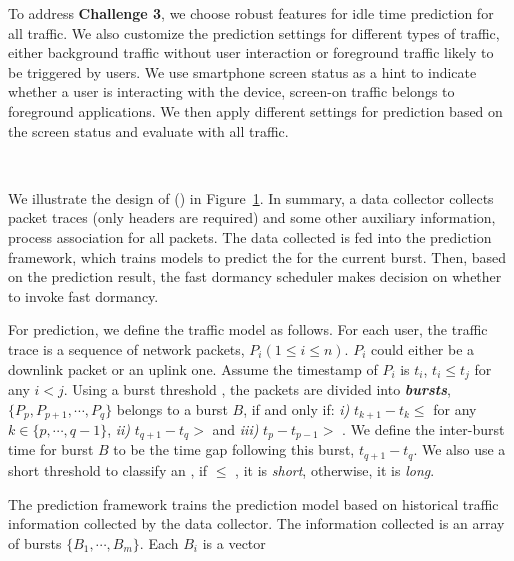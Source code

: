 To address {\bf Challenge 3}, we choose robust features for idle time prediction for all traffic. We also customize the prediction settings for different types of traffic, either background traffic without user interaction or foreground traffic likely to be triggered by users. We use smartphone screen status as a hint to indicate whether a user is interacting with the device, \ie screen-on traffic belongs to foreground applications. We then apply different settings for prediction based on the screen status and evaluate \NAME with all traffic.

\begin{figure}[t]
\centering
{} \\
\label{fig:flow}
\end{figure}

We illustrate the design of  \NAMEFULL (\NAME) in Figure~\ref{fig:flow}. In summary, a data collector collects packet traces (only headers are required) and some other auxiliary information, \eg process association for all packets. The data collected is fed into the \IBT prediction framework, which trains models to predict the \IBT for the current burst. Then, based on the prediction result, the fast dormancy scheduler makes decision on whether to invoke fast dormancy.

For \IBT prediction, we define the traffic model as follows. For each user, the traffic trace is a sequence of network packets, $P_{i} (1 \leq i \leq n)$. $P_{i}$ could either be a downlink packet or an uplink one. Assume the timestamp of $P_{i}$ is $t_{i}$, $t_{i} \leq t_{j}$ for any $i < j$. Using a burst threshold \BT, the packets are divided into \textbf{\em bursts}, \ie $\{P_{p}, P_{p+1}, \cdots, P_{q}\}$ belongs to a burst $B$, if and only if: {\em i)} $t_{k + 1} - t_{k} \leq$ \BT for any $k \in \{p, \cdots, q - 1\}$, {\em ii)} $t_{q+1} - t_{q} > $ \BT and {\em iii)} $t_{p} - t_{p - 1} > $ \BT. We define the inter-burst time \IBT for burst $B$ to be the time gap following this burst, \ie $t_{q+1} - t_{q}$. We also use a short \IBT threshold \SBT to classify an \IBT, \ie if \IBT $\leq$ \SBT, it is {\em short}, otherwise, it is {\em long}.

The \IBT prediction framework trains the prediction model based on historical traffic information collected by the data collector. The information collected is an array of bursts $\{B_{1}, \cdots, B_{m}\}$. Each $B_{i}$ is a vector

